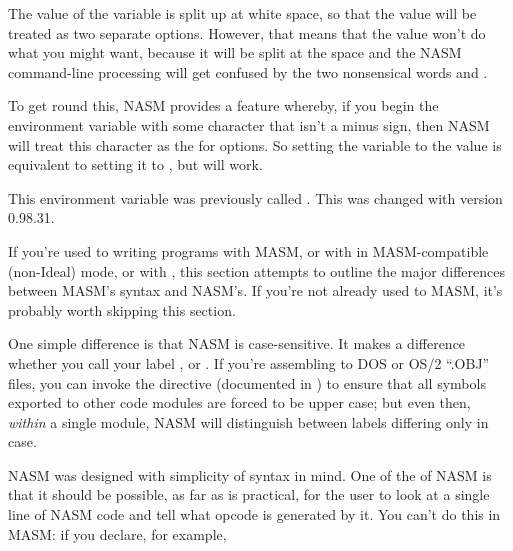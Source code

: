The value of the variable is split up at white space, so that the
value  will be
treated as two separate options. However, that means that the value
 won't do what you might want, because it
will be split at the space and the NASM command-line processing
will get confused by the two nonsensical words 
and .

To get round this, NASM provides a feature whereby, if you begin the
 environment variable with some character that isn't
a minus sign, then NASM will treat this character as the
 for options. So setting the 
variable to the value 
is equivalent to setting it to ,
but  will work.

This environment variable was previously called . This was
changed with version 0.98.31.


If you're used to writing programs with MASM, or with  in
MASM-compatible (non-Ideal) mode, or with , this section
attempts to outline the major differences between MASM's syntax and
NASM's. If you're not already used to MASM, it's probably worth
skipping this section.


One simple difference is that NASM is case-sensitive. It makes a
difference whether you call your label ,  or
. If you're assembling to DOS or OS/2 ``.OBJ'' files,
you can invoke the  directive (documented in
) to ensure that all symbols exported to other
code modules are forced to be upper case; but even then, \emph{within}
a single module, NASM will distinguish between labels differing only
in case.


NASM was designed with simplicity of syntax in mind. One of the
 of NASM is that it should be possible,
as far as is practical, for the user to look at a single line of
NASM code and tell what opcode is generated by it. You can't do
this in MASM: if you declare, for example,

